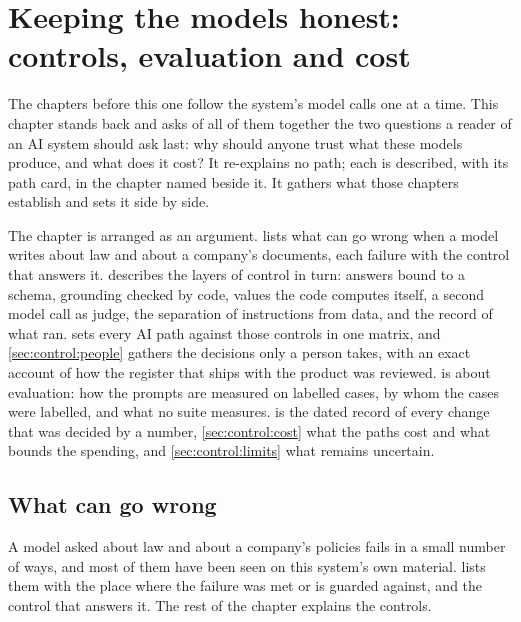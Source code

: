 \chapter{Keeping the models honest: controls, evaluation and cost}\label{ch:control}

The chapters before this one follow the system's model calls one at a time. This chapter
stands back and asks of all of them together the two questions a reader of an AI system
should ask last: why should anyone trust what these models produce, and what does it cost?
It re-explains no path; each is described, with its path card, in the chapter named beside
it. It gathers what those chapters establish and sets it side by side.

The chapter is arranged as an argument.  lists what can go wrong when
a model writes about law and about a company's documents, each failure with the control that
answers it.  describes the layers of control in turn: answers bound
to a schema, grounding checked by code, values the code computes itself, a second model call as
judge, the separation of instructions from data, and the record of what ran.
 sets every AI path against those controls in one matrix, and
\cref{sec:control:people} gathers the decisions only a person takes, with an exact account
of how the register that ships with the product was reviewed.  is
about evaluation: how the prompts are measured on labelled cases, by whom the cases were
labelled, and what no suite measures.  is the dated record of every
change that was decided by a number, \cref{sec:control:cost} what the paths cost and what
bounds the spending, and \cref{sec:control:limits} what remains uncertain.


\section{What can go wrong}\label{sec:control:risks}

A model asked about law and about a company's policies fails in a small number of ways, and
most of them have been seen on this system's own material.  lists them
with the place where the failure was met or is guarded against, and the control that answers
it. The rest of the chapter explains the controls.

